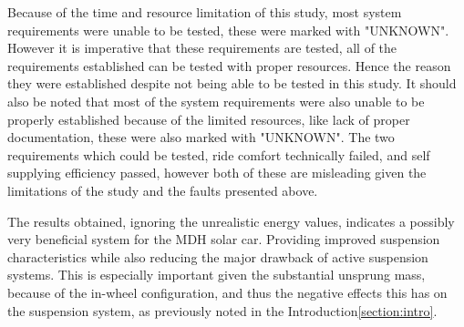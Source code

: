
Because of the time and resource limitation of this study, most system requirements were unable to be tested, these were marked with "UNKNOWN". However it is imperative that these requirements are tested, all of the requirements established can be tested with proper resources. Hence the reason they were established despite not being able to be tested in this study.
It should also be noted that most of the system requirements were also unable to be properly established because of the limited resources, like lack of proper documentation, these were also marked with "UNKNOWN".
The two requirements which could be tested, ride comfort technically failed, and self supplying efficiency passed, however both of these are misleading given the limitations of the study and the faults presented above.


The results obtained, ignoring the unrealistic energy values, indicates a possibly very beneficial system for the MDH solar car. Providing improved suspension characteristics while also reducing the major drawback of active suspension systems. This is especially important given the substantial unsprung mass, because of the in-wheel configuration, and thus the negative effects this has on the suspension system\:\cite{yinPerformanceEvaluationActive2015}, as previously noted in the Introduction\:\ref{section:intro}.



\begin{comment}
\end{comment}

